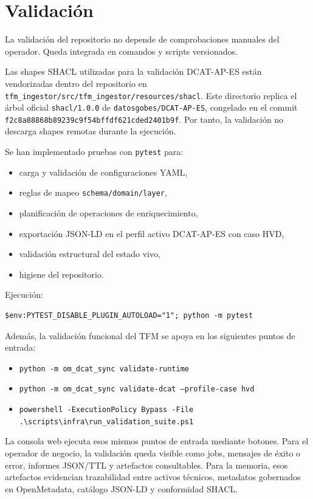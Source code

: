 \section{Validación}

La validación del repositorio no depende de comprobaciones manuales del operador. Queda integrada en comandos y scripts versionados.

Las shapes SHACL utilizadas para la validación DCAT-AP-ES están vendorizadas dentro del repositorio en \texttt{tfm\_ingestor/src/tfm\_ingestor/resources/shacl}. Este directorio replica el árbol oficial \texttt{shacl/1.0.0} de \texttt{datosgobes/DCAT-AP-ES}, congelado en el commit \texttt{f2c8a88868b89239c9f54bffdf621cded2401b9f}. Por tanto, la validación no descarga shapes remotas durante la ejecución.

Se han implementado pruebas con \texttt{pytest} para:
\begin{itemize}
  \item carga y validación de configuraciones YAML,
  \item reglas de mapeo \texttt{schema/domain/layer},
  \item planificación de operaciones de enriquecimiento,
  \item exportación JSON-LD en el perfil activo DCAT-AP-ES con caso HVD,
  \item validación estructural del estado vivo,
  \item higiene del repositorio.
\end{itemize}

Ejecución:
\begin{verbatim}
$env:PYTEST_DISABLE_PLUGIN_AUTOLOAD="1"; python -m pytest
\end{verbatim}

Además, la validación funcional del TFM se apoya en los siguientes puntos de entrada:
\begin{itemize}
  \item \texttt{python -m om\_dcat\_sync validate-runtime}
  \item \texttt{python -m om\_dcat\_sync validate-dcat --profile-case hvd}
  \item \texttt{powershell -ExecutionPolicy Bypass -File .\textbackslash scripts\textbackslash infra\textbackslash run\_validation\_suite.ps1}
\end{itemize}

La consola web ejecuta esos mismos puntos de entrada mediante botones. Para el operador de negocio, la validación queda visible como jobs, mensajes de éxito o error, informes JSON/TTL y artefactos consultables. Para la memoria, esos artefactos evidencian trazabilidad entre activos técnicos, metadatos gobernados en OpenMetadata, catálogo JSON-LD y conformidad SHACL.

